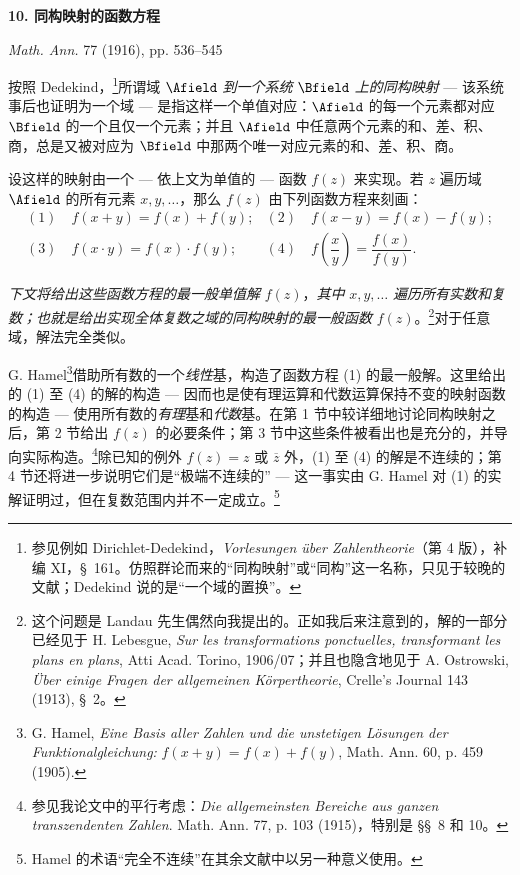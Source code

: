 \begin{center}
{\Large\bfseries 10. 同构映射的函数方程}\par
\vspace{1.25em}
\emph{Math. Ann.} 77 (1916), pp. 536--545
\end{center}

\vspace{2em}

按照 Dedekind，\footnote{参见例如 Dirichlet-Dedekind，\emph{Vorlesungen über Zahlentheorie}（第 4 版），补编 XI，\S\ 161。仿照群论而来的“同构映射”或“同构”这一名称，只见于较晚的文献；Dedekind 说的是“一个域的置换”。}所谓域 $\Afield$ \emph{到一个系统} $\Bfield$ \emph{上的同构映射} --- 该系统事后也证明为一个域 --- 是指这样一个单值对应：$\Afield$ 的每一个元素都对应 $\Bfield$ 的一个且仅一个元素；并且 $\Afield$ 中任意两个元素的和、差、积、商，总是又被对应为 $\Bfield$ 中那两个唯一对应元素的和、差、积、商。

设这样的映射由一个 --- 依上文为单值的 --- 函数 $f(z)$ 来实现。若 $z$ 遍历域 $\Afield$ 的所有元素 $x,y,\ldots$，那么 $f(z)$ 由下列函数方程来刻画：
\[
\begin{array}{ll}
(1)\quad f(x+y)=f(x)+f(y); & (2)\quad f(x-y)=f(x)-f(y);\\[0.45em]
(3)\quad f(x\cdot y)=f(x)\cdot f(y); & (4)\quad f\!\left(\dfrac{x}{y}\right)=\dfrac{f(x)}{f(y)}.
\end{array}
\]

\emph{下文将给出这些函数方程的最一般单值解} $f(z)$，\emph{其中} $x,y,\ldots$ \emph{遍历所有实数和复数；也就是给出实现全体复数之域的同构映射的最一般函数} $f(z)$。\footnote{这个问题是 Landau 先生偶然向我提出的。正如我后来注意到的，解的一部分已经见于 H. Lebesgue, \emph{Sur les transformations ponctuelles, transformant les plans en plans}, Atti Acad. Torino, 1906/07；并且也隐含地见于 A. Ostrowski, \emph{Über einige Fragen der allgemeinen Körpertheorie}, Crelle's Journal 143 (1913), \S\ 2。}对于任意域，解法完全类似。

G. Hamel\footnote{G. Hamel, \emph{Eine Basis aller Zahlen und die unstetigen Lösungen der Funktionalgleichung:} $f(x+y)=f(x)+f(y)$, Math. Ann. 60, p. 459 (1905).}借助所有数的一个\emph{线性}基，构造了函数方程 (1) 的最一般解。这里给出的 (1) 至 (4) 的解的构造 --- 因而也是使有理运算和代数运算保持不变的映射函数的构造 --- 使用所有数的\emph{有理}基和\emph{代数}基。在第 1 节中较详细地讨论同构映射之后，第 2 节给出 $f(z)$ 的必要条件；第 3 节中这些条件被看出也是充分的，并导向实际构造。\footnote{参见我论文中的平行考虑：\emph{Die allgemeinsten Bereiche aus ganzen transzendenten Zahlen}. Math. Ann. 77, p. 103 (1915)，特别是 \S\S\ 8 和 10。}除已知的例外 $f(z)=z$ 或 $\overline z$ 外，(1) 至 (4) 的解是不连续的；第 4 节还将进一步说明它们是“极端不连续的” --- 这一事实由 G. Hamel 对 (1) 的实解证明过，但在复数范围内并不一定成立。\footnote{Hamel 的术语“完全不连续”在其余文献中以另一种意义使用。}

